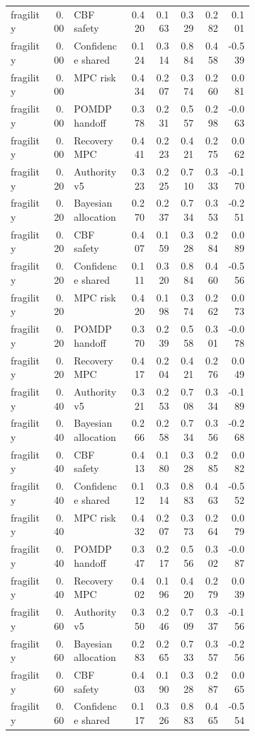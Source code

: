 \documentclass{article}
\begin{document}
\begin{center}
\begin{longtable}{p{0.17\linewidth}rp{0.23\linewidth}rrrrr}
fragility & 0.00 & CBF safety & 0.420 & 0.163 & 0.329 & 0.282 & 0.101\\
fragility & 0.00 & Confidence shared & 0.124 & 0.314 & 0.884 & 0.458 & -0.539\\
fragility & 0.00 & MPC risk & 0.434 & 0.207 & 0.374 & 0.260 & 0.081\\
fragility & 0.00 & POMDP handoff & 0.378 & 0.231 & 0.557 & 0.298 & -0.063\\
fragility & 0.00 & Recovery MPC & 0.441 & 0.223 & 0.421 & 0.275 & 0.062\\
fragility & 0.20 & Authority v5 & 0.323 & 0.225 & 0.710 & 0.333 & -0.170\\
fragility & 0.20 & Bayesian allocation & 0.270 & 0.237 & 0.734 & 0.353 & -0.251\\
fragility & 0.20 & CBF safety & 0.407 & 0.159 & 0.328 & 0.284 & 0.089\\
fragility & 0.20 & Confidence shared & 0.111 & 0.320 & 0.884 & 0.460 & -0.556\\
fragility & 0.20 & MPC risk & 0.420 & 0.198 & 0.374 & 0.262 & 0.073\\
fragility & 0.20 & POMDP handoff & 0.370 & 0.239 & 0.558 & 0.301 & -0.078\\
fragility & 0.20 & Recovery MPC & 0.417 & 0.204 & 0.421 & 0.276 & 0.049\\
fragility & 0.40 & Authority v5 & 0.321 & 0.253 & 0.708 & 0.334 & -0.189\\
fragility & 0.40 & Bayesian allocation & 0.266 & 0.258 & 0.734 & 0.356 & -0.268\\
fragility & 0.40 & CBF safety & 0.413 & 0.180 & 0.328 & 0.285 & 0.082\\
fragility & 0.40 & Confidence shared & 0.112 & 0.314 & 0.883 & 0.463 & -0.552\\
fragility & 0.40 & MPC risk & 0.432 & 0.207 & 0.373 & 0.264 & 0.079\\
fragility & 0.40 & POMDP handoff & 0.347 & 0.217 & 0.556 & 0.302 & -0.087\\
fragility & 0.40 & Recovery MPC & 0.402 & 0.196 & 0.420 & 0.279 & 0.039\\
fragility & 0.60 & Authority v5 & 0.350 & 0.246 & 0.709 & 0.337 & -0.156\\
fragility & 0.60 & Bayesian allocation & 0.283 & 0.265 & 0.733 & 0.357 & -0.256\\
fragility & 0.60 & CBF safety & 0.403 & 0.190 & 0.328 & 0.287 & 0.065\\
fragility & 0.60 & Confidence shared & 0.117 & 0.326 & 0.883 & 0.465 & -0.554\\

\end{longtable}
\end{center}
\end{document}
